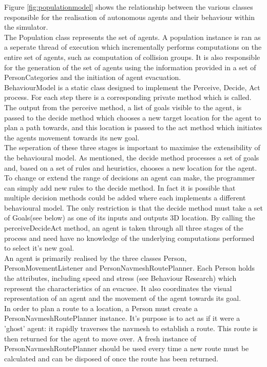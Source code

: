 Figure \ref{fig:populationmodel} shows the relationship between the various classes responsible
for the realisation of autonomous agents and their behaviour within the simulator.
\\
The Population class represents the set of agents. A population instance is ran as a seperate thread of execution which
incrementally performs computations on the entire set of agents, such as computation of collision groups. It is also responsible
for the generation of the set of agents using the information provided in a set of PersonCategories and the initiation
of agent evacuation.
\\
BehaviourModel is a static class designed to implement the Perceive, Decide, Act process. For each step there is a corresponding 
private method which is called. The output from the perceive method, a list of goals visible to the agent, is passed to the decide method
which chooses a new target location for the agent to plan a path towards, and this location is passed to the act method which initiates the agents
movement towards its new goal.
\\
The seperation of these three stages is important to maximise the extensibility of the behavioural model. As mentioned, the decide method processes a set of
goals and, based on a set of rules and heuristics, chooses a new location for the agent. To change or extend the range of decisions an agent can make,
the programmer can simply add new rules to the decide method. In fact it is possible that multiple decision methods could be added where each implements
a different behavioural model. The only restriction is that the decide method must take a set of Goals(see below) as one of its inputs and outputs 3D location.
By calling the perceiveDecideAct method, an agent is taken through all three stages of the process and need have no knowledge of the underlying
computations performed to select it's new goal.
\\

An agent is primarily realised by the three classes Person, PersonMovementListener and PersonNavmeshRoutePlanner. 
Each Person holds the attributes, including speed and stress (see Behaviour Research) which represent the characteristics of 
an evacuee. It also coordinates the visual representation of an agent and the movement of the agent towards its goal.
\\
In order to plan a route to a location, a Person must create a PersonNavmeshRoutePlanner instance. It's purpose is to act 
as if it were a 'ghost' agent: it rapidly traverses the navmesh to establish a route. This route is then returned for the 
agent to move over. A fresh instance of PersonNavmeshRoutePlanner should be used every time a new route must be calculated and can be disposed
of once the route has been returned.

